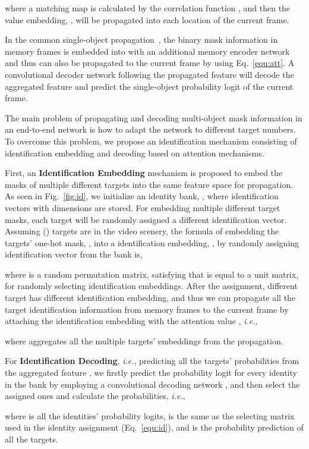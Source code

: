 \documentclass{article}
\def\ie{\emph{i.e.}}
\begin{document}
where a matching map is calculated by the correlation function , and then the value embedding, , will be propagated into each location of the current frame.

In the common single-object propagation~\cite{spacetime}, the binary mask information in memory frames is embedded into  with an additional memory encoder network and thus can also be propagated to the current frame by using Eq.~\ref{equ:att}. A convolutional decoder network following the propagated feature will decode the aggregated feature and predict the single-object probability logit of the current frame.

The main problem of propagating and decoding multi-object mask information in an end-to-end network is how to adapt the network to different target numbers. To overcome this problem, we propose an identification mechanism consisting of identification embedding and decoding based on attention mechanisms.

First, an \textbf{Identification Embedding} mechanism is proposed to embed the masks of multiple different targets into the same feature space for propagation. As seen in Fig.~\ref{fig:id}, we initialize an identity bank, , where  identification vectors with  dimensions are stored. For embedding multiple different target masks, each target will be randomly assigned a different identification vector. Assuming  () targets are in the video scenery, the formula of embedding the targets' one-hot mask, , into a identification embedding, , by randomly assigning identification vector from the bank  is,

where  is a random permutation matrix, satisfying that  is equal to a  unit matrix, for randomly selecting  identification embeddings. After the  assignment, different target has different identification embedding, and thus we can propagate all the target identification information from memory frames to the current frame by attaching the identification embedding  with the attention value , \ie,

where  aggregates all the multiple targets' embeddings from the propagation.

For \textbf{Identification Decoding}, \ie, predicting all the targets' probabilities from the aggregated feature , we firstly predict the probability logit for every identity in the bank  by employing a convolutional decoding network , and then select the assigned ones and calculate the probabilities, \ie,

where  is all the  identities' probability logits,  is the same as the selecting matrix used in the identity assignment (Eq.~\ref{equ:id}), and  is the probability prediction of all the  targets.
\end{document}
